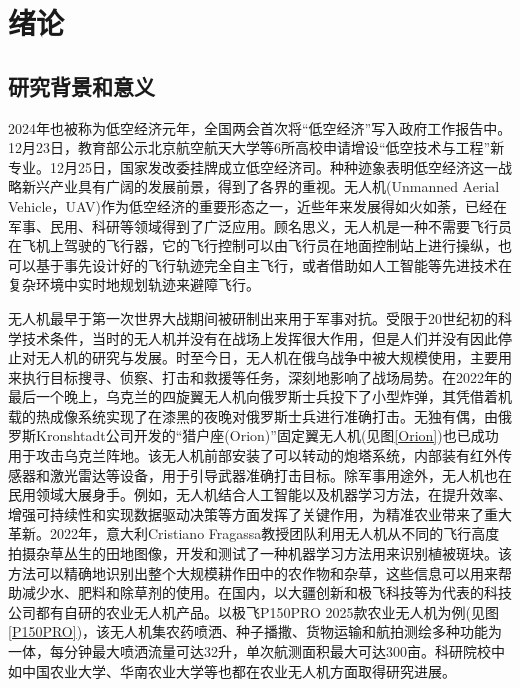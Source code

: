 \chapter{绪论}
%
\section{研究背景和意义}
%
2024年也被称为低空经济元年，全国两会首次将“低空经济”写入政府工作报告中。12月23日，教育部公示北京航空航天大学等6所高校申请增设“低空技术与工程”新专业。12月25日，国家发改委挂牌成立低空经济司。种种迹象表明低空经济这一战略新兴产业具有广阔的发展前景，得到了各界的重视。无人机(Unmanned Aerial Vehicle，UAV)作为低空经济的重要形态之一，近些年来发展得如火如荼，已经在军事、民用、科研等领域得到了广泛应用。顾名思义，无人机是一种不需要飞行员在飞机上驾驶的飞行器，它的飞行控制可以由飞行员在地面控制站上进行操纵，也可以基于事先设计好的飞行轨迹完全自主飞行，或者借助如人工智能等先进技术在复杂环境中实时地规划轨迹来避障飞行\cite{rezwanArtificialIntelligenceApproaches2022}。%

无人机最早于第一次世界大战期间被研制出来用于军事对抗。受限于20世纪初的科学技术条件，当时的无人机并没有在战场上发挥很大作用，但是人们并没有因此停止对无人机的研究与发展。时至今日，无人机在俄乌战争中被大规模使用，主要用来执行目标搜寻、侦察、打击和救援等任务，深刻地影响了战场局势。在2022年的最后一个晚上，乌克兰的四旋翼无人机向俄罗斯士兵投下了小型炸弹，其凭借着机载的热成像系统实现了在漆黑的夜晚对俄罗斯士兵进行准确打击\cite{kunertovaWarUkraineShows2023}。无独有偶，由俄罗斯Kronshtadt公司开发的“猎户座(Orion)”固定翼无人机(见图\ref{Orion})也已成功用于攻击乌克兰阵地。该无人机前部安装了可以转动的炮塔系统，内部装有红外传感器和激光雷达等设备，用于引导武器准确打击目标。除军事用途外，无人机也在民用领域大展身手。例如，无人机结合人工智能以及机器学习方法，在提升效率、增强可持续性和实现数据驱动决策等方面发挥了关键作用，为精准农业带来了重大革新\cite{agrawal2024transforming}。2022年，意大利Cristiano Fragassa教授团队利用无人机从不同的飞行高度拍摄杂草丛生的田地图像，开发和测试了一种机器学习方法用来识别植被斑块。该方法可以精确地识别出整个大规模耕作田中的农作物和杂草，这些信息可以用来帮助减少水、肥料和除草剂的使用\cite{fragassaNewProcedureCombining2023}。在国内，以大疆创新和极飞科技等为代表的科技公司都有自研的农业无人机产品。以极飞P150PRO 2025款农业无人机为例(见图\ref{P150PRO})，该无人机集农药喷洒、种子播撒、货物运输和航拍测绘多种功能为一体，每分钟最大喷洒流量可达32升，单次航测面积最大可达300亩。科研院校中如中国农业大学、华南农业大学\cite{liuAgriculturalUAVObstacle2024a}等也都在农业无人机方面取得研究进展。

